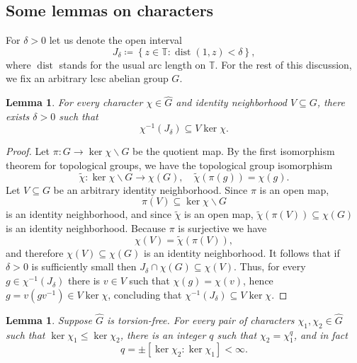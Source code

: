 \documentclass{amsart}
\numberwithin{equation}{subsection}
\newtheorem{lem}[thm]{Lemma}
\theoremstyle{remark}
\begin{document}
\subsection{Some lemmas on characters}

For \(\delta>0\) let us denote the open interval
\[J_{\delta}\coloneqq\left\{ z\in\mathbb{T}:\operatorname{dist}\left(1,z\right)<\delta\right\},\]
where \(\operatorname{dist}\) stands for the usual arc length on \(\mathbb{T}\). For the rest of this discussion, we fix an arbitrary lcsc abelian group \(G\).

\begin{lem}\label{lem:genlem1}
For every character \(\chi\in\widehat{G}\) and identity neighborhood \(V\subseteq G\), there exists \(\delta>0\) such that
\[\chi^{-1}\left(J_{\delta}\right)\subseteq V\ker\chi.\]
\end{lem}

\begin{proof}
Let \(\pi:G\to\ker\chi\backslash G\) be the quotient map. By the first isomorphism theorem for topological groups, we have the topological group isomorphism
\[\widetilde{\chi}:\ker\chi\backslash G\longrightarrow\chi\left(G\right),\quad\widetilde{\chi}\left(\pi\left(g\right)\right)=\chi\left(g\right).\]
Let \(V\subseteq G\) be an arbitrary identity neighborhood. Since \(\pi\) is an open map,
\[\pi\left(V\right)\subseteq\ker\chi\backslash G\]
is an identity neighborhood, and since \(\widetilde{\chi}\) is an open map, \(\widetilde{\chi}\left(\pi\left(V\right)\right)\subseteq\chi\left(G\right)\) is an identity neighborhood. Because \(\pi\) is surjective we have
\[\chi\left(V\right)=\widetilde{\chi}\left(\pi\left(V\right)\right),\]
and therefore \(\chi\left(V\right)\subseteq\chi\left(G\right)\) is an identity neighborhood. It follows that if \(\delta>0\) is sufficiently small then \(J_{\delta}\cap\chi\left(G\right)\subseteq\chi\left(V\right)\). Thus, for every \(g\in \chi^{-1}\left(J_{\delta}\right)\) there is \(v\in V\) such that \(\chi\left(g\right)=\chi\left(v\right)\), hence \(g=v\left(gv^{-1}\right)\in V\ker\chi\), concluding that \(\chi^{-1}\left(J_{\delta}\right)\subseteq V\ker\chi\).
\end{proof}

\begin{lem}\label{lem:genlem2}
Suppose \(\widehat{G}\) is torsion-free. For every pair of characters \(\chi_{1},\chi_{2}\in\widehat{G}\) such that \(\ker\chi_{1}\leq\ker\chi_{2}\), there is an integer \(q\) such that \(\chi_{2}=\chi_{1}^{q}\), and in fact
\[q=\pm\left[\ker\chi_{2}:\ker\chi_{1}\right]<\infty.\]
\end{lem}
\end{document}
